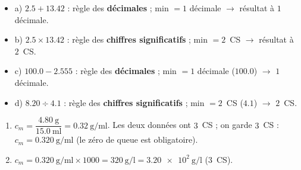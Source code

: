 \documentclass[11pt,a4paper]{article}
\newcommand{\CS}{chiffres significatifs}
\begin{document}
\begin{cor}
\begin{itemize}[leftmargin=1.6em,itemsep=1pt]
  \item a) $\num{2,5}+\num{13,42}$ : règle des \textbf{décimales} ; min $=1$ décimale $\to$ résultat à $1$ décimale.
  \item b) $\num{2,5}\times\num{13,42}$ : règle des \textbf{\CS} ; min $=2$~CS $\to$ résultat à $2$~CS.
  \item c) $\num{100,0}-\num{2,555}$ : règle des \textbf{décimales} ; min $=1$ décimale ($\num{100,0}$) $\to$ $1$ décimale.
  \item d) $\num{8,20}\div\num{4,1}$ : règle des \textbf{\CS} ; min $=2$~CS ($\num{4,1}$) $\to$ $2$~CS.
\end{itemize}
\end{cor}

\begin{cor}
\begin{enumerate}[label=\alph*),leftmargin=1.6em,itemsep=1pt]
  \item $c_m=\dfrac{\qty{4,80}{\gram}}{\qty{15,0}{\milli\litre}}=\num{0,32}\ \si{\gram\per\milli\litre}$.
        Les deux données ont $3$~CS ; on garde $3$~CS : $\boxed{c_m=\qty{0,320}{\gram\per\milli\litre}}$
        (le zéro de queue est obligatoire).
  \item $c_m=\qty{0,320}{\gram\per\milli\litre}\times\num{1000}=\qty{320}{\gram\per\litre}
        =\num{3,20e2}\ \si{\gram\per\litre}$ ($3$~CS).
\end{enumerate}
\end{cor}
\end{document}
